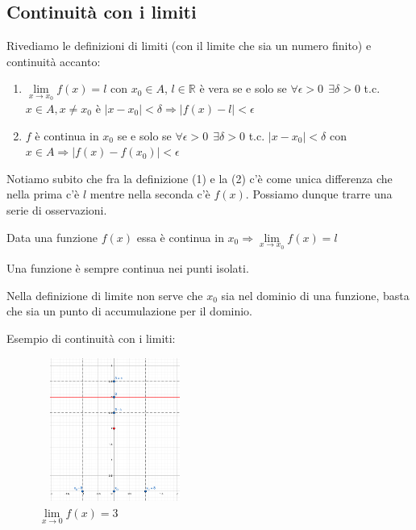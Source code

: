 \subsection{Continuità con i limiti}
Rivediamo le definizioni di limiti (con il limite che sia un numero finito)  e continuità accanto:
\begin{enumerate}
    \item $\lim\limits_{x\to x_0}f(x) = l$ con $x_0 \in A$, $l \in \mathbb{R}$ è vera se e solo se $\forall\epsilon > 0 \: \: \exists \delta >0$ t.c. $x \in A, x \neq x_0$ è $|x - x_0| < \delta \Longrightarrow |f(x) - l| < \epsilon$
    \item $f$ è continua in $x_0$ se e solo se $\forall \epsilon > 0 \: \: \exists \delta > 0$ t.c. $|x - x_0| < \delta$ con $x \in A \Longrightarrow |f(x) - f(x_0)| < \epsilon$
\end{enumerate}
Notiamo subito che fra la definizione (1) e la (2) c'è come unica differenza che nella prima c'è $l$ mentre nella seconda c'è $f(x)$. Possiamo dunque trarre una serie di osservazioni.
\begin{observation}
Data una funzione $f(x)$ essa è continua in $x_0 \Longrightarrow \lim\limits_{x\to x_0}f(x) = l$
\end{observation}
\begin{observation}
Una funzione è sempre continua nei punti isolati.
\end{observation}
\begin{observation}
Nella definizione di limite non serve che $x_0$ sia nel dominio di una funzione, basta che sia un punto di accumulazione per il dominio.
\end{observation}
\begin{example}
Esempio di continuità con i limiti:
\end{example}
\begin{figure}
    \vspace{-50pt}
    \centering
    \includegraphics[width=5cm, height=4.7cm]{images/es-continuita-limiti.png}
    \caption{$\lim\limits_{x\to 0}f(x) = 3$}
\end{figure}

